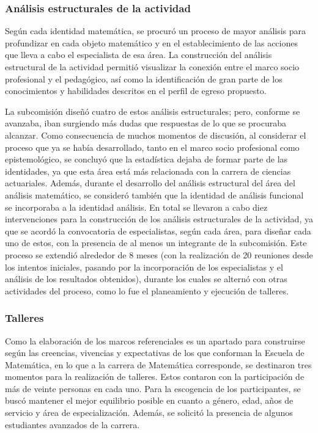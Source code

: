 \subsubsection{Análisis estructurales de la actividad}

Según cada identidad matemática, se procuró un proceso de mayor análisis para profundizar en cada objeto matemático y en el establecimiento de las acciones que lleva a cabo el especialista de esa área. La construcción del análisis estructural de la actividad permitió visualizar la conexión entre el marco socio profesional y el pedagógico, así como la identificación de gran parte de los conocimientos y habilidades descritos en el perfil de egreso propuesto. 

La subcomisión diseñó cuatro de estos análisis estructurales; pero, conforme se avanzaba, iban surgiendo más dudas que respuestas de lo que se procuraba alcanzar. Como consecuencia de
muchos momentos de discusión, al considerar el proceso que ya se había desarrollado, tanto en el marco socio profesional como epistemológico, se concluyó que la estadística dejaba de formar parte de las identidades, ya que esta área está más relacionada con la carrera de ciencias actuariales. Además, durante el desarrollo del análisis estructural del área del análisis matemático, se consideró también que la identidad de análisis funcional se incorporaba a la identidad análisis. En total se llevaron a cabo diez intervenciones para la construcción de los análisis estructurales de la actividad, ya que se acordó la convocatoria de especialistas, según cada área, para diseñar cada uno de estos, con la presencia de al menos un integrante de la subcomisión. Este proceso se extendió alrededor de 8 meses (con la realización de 20 reuniones desde los intentos iniciales, pasando por la incorporación de los especialistas y el análisis de los resultados obtenidos), durante los cuales se alternó con otras actividades del proceso, como lo fue el planeamiento y ejecución de talleres. 


\subsubsection{Talleres}

Como la elaboración de los marcos referenciales es un apartado para construirse según las creencias, vivencias y expectativas de los que conforman la Escuela de Matemática, en lo que a la carrera de Matemática corresponde, se destinaron tres momentos para la realización de talleres. Estos contaron con la participación de más de veinte personas en cada uno. Para la escogencia de los participantes, se buscó mantener el mejor equilibrio posible en cuanto a género, edad, años de servicio y área de especialización. Además, se solicitó la presencia de algunos estudiantes avanzados de la carrera. 

